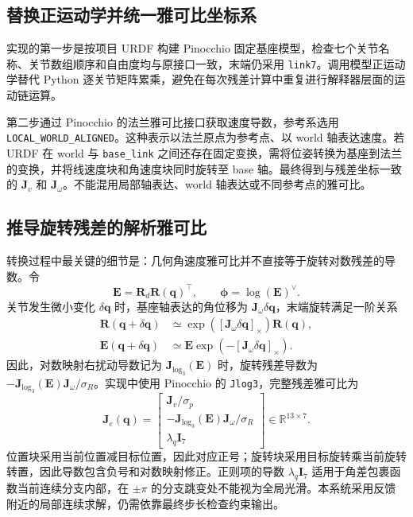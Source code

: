 \documentclass[UTF8,a4paper,zihao=-4]{ctexart}
\begin{document}
\subsection{替换正运动学并统一雅可比坐标系}

实现的第一步是按项目 URDF 构建 Pinocchio 固定基座模型，检查七个关节名称、关节数组顺序和自由度均与原接口一致，末端仍采用 \texttt{link7}。调用模型正运动学替代 Python 逐关节矩阵累乘，避免在每次残差计算中重复进行解释器层面的运动链运算。

第二步通过 Pinocchio 的法兰雅可比接口获取速度导数，参考系选用 \texttt{LOCAL\_WORLD\_ALIGNED}。这种表示以法兰原点为参考点、以 world 轴表达速度。若 URDF 在 world 与 \texttt{base\_link} 之间还存在固定变换，需将位姿转换为基座到法兰的变换，并将线速度块和角速度块同时旋转至 base 轴。最终得到与残差坐标一致的 $\bm J_v$ 和 $\bm J_\omega$。不能混用局部轴表达、world 轴表达或不同参考点的雅可比。

\subsection{推导旋转残差的解析雅可比}

转换过程中最关键的细节是：几何角速度雅可比并不直接等于旋转对数残差的导数。令
\begin{equation}
\bm E=\bm R_d\bm R(\bm q)^\top,\qquad
\bm\phi=\log(\bm E)^\vee.
\end{equation}
关节发生微小变化 $\delta\bm q$ 时，基座轴表达的角位移为 $\bm J_\omega\delta\bm q$，末端旋转满足一阶关系
\begin{align}
\bm R(\bm q+\delta\bm q)
&\simeq\exp([\bm J_\omega\delta\bm q]_\times)\bm R(\bm q),\\
\bm E(\bm q+\delta\bm q)
&\simeq\bm E\exp(-[\bm J_\omega\delta\bm q]_\times).
\end{align}
因此，对数映射右扰动导数记为 $\bm J_{\log_3}(\bm E)$ 时，旋转残差导数为 $-\bm J_{\log_3}(\bm E)\bm J_\omega/\sigma_R$。实现中使用 Pinocchio 的 \texttt{Jlog3}，完整残差雅可比为
\begin{equation}
\boxed{\quad
\bm J_e(\bm q)=
\begin{bmatrix}
\bm J_v/\sigma_p\\[3pt]
-\bm J_{\log_3}(\bm E)\bm J_\omega/\sigma_R\\[3pt]
\lambda_q\bm I_7
\end{bmatrix}
\in\mathbb R^{13\times7}.
\quad}
\end{equation}
位置块采用当前位置减目标位置，因此对应正号；旋转块采用目标旋转乘当前旋转转置，因此导数包含负号和对数映射修正。正则项的导数 $\lambda_q\bm I_7$ 适用于角差包裹函数当前连续分支内部，在 $\pm\pi$ 的分支跳变处不能视为全局光滑。本系统采用反馈附近的局部连续求解，仍需依靠最终步长检查约束输出。
\end{document}
